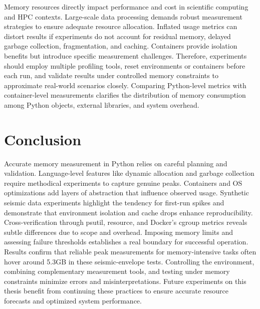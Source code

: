Memory resources directly impact performance and cost in scientific computing and \ac{HPC} contexts.
Large-scale data processing demands robust measurement strategies to ensure adequate resource allocation.
Inflated usage metrics can distort results if experiments do not account for residual memory, delayed garbage collection, fragmentation, and caching.
Containers provide isolation benefits but introduce specific measurement challenges.
Therefore, experiments should employ multiple profiling tools, reset environments or containers before each run, and validate results under controlled memory constraints to approximate real-world scenarios closely.
Comparing Python-level metrics with container-level measurements clarifies the distribution of memory consumption among Python objects, external libraries, and system overhead.


\section{Conclusion}
\label{sec:appendix-conclusion}

Accurate memory measurement in Python relies on careful planning and validation.
Language-level features like dynamic allocation and garbage collection require methodical experiments to capture genuine peaks.
Containers and \ac{OS} optimizations add layers of abstraction that influence observed usage.
Synthetic seismic data experiments highlight the tendency for first-run spikes and demonstrate that environment isolation and cache drops enhance reproducibility.
Cross-verification through psutil, resource, and Docker's cgroup metrics reveals subtle differences due to scope and overhead.
Imposing memory limits and assessing failure thresholds establishes a real boundary for successful operation.
Results confirm that reliable peak measurements for memory-intensive tasks often hover around 5.3\ac{GB} in these seismic-envelope tests.
Controlling the environment, combining complementary measurement tools, and testing under memory constraints minimize errors and misinterpretations.
Future experiments on this thesis benefit from continuing these practices to ensure accurate resource forecasts and optimized system performance.